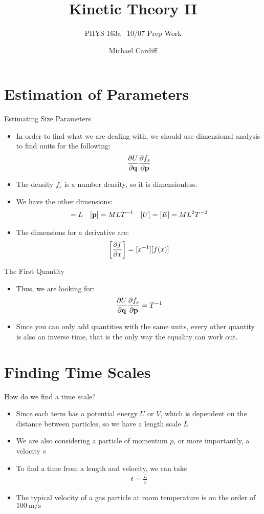 \documentclass{beamer}
\title{Kinetic Theory II}
\author{Michael Cardiff}
\subtitle{PHYS 163a \ 10/07 Prep Work}
\begin{document}
\begin{frame}
  \titlepage
\end{frame}

\section{Estimation of Parameters}
\begin{frame}{Estimating Size Parameters}
  \begin{itemize}
  \item In order to find what we are dealing with, we should use dimensional analysis to find units for the following:
    \begin{align*}
      \pdv{U}{\vb{q}}\pdv{f_s}{\vb{p}}
    \end{align*}
  \item The density $f_s$ is a number density, so it is dimensionless.
  \item We have the other dimensions:
    \begin{align*}
      [\vb{q}]=L\quad[\vb{p}]=MLT^{-1}\quad[U]=[E]=ML^2T^{-2}
    \end{align*}
  \item The dimensions for a derivative are:
    \begin{align*}
      \qty[\pdv{f}{x}]=[x^{-1}][f(x)]
    \end{align*}
  \end{itemize}
\end{frame}
\begin{frame}{The First Quantity}
  \begin{itemize}
  \item Thus, we are looking for:
    \begin{align*}
      \pdv{U}{\vb{q}}\pdv{f_s}{\vb{p}}=T^{-1}
    \end{align*}
  \item Since you can only add quantities with the same units, every other quantity is also an inverse time, that is the only way the equality can work out.
  \end{itemize}
\end{frame}
\section{Finding Time Scales}
\begin{frame}{How do we find a time scale?}
  \begin{itemize}
  \item Since each term has a potential energy $U$ or $V$, which is dependent on the distance between particles, so we have a length scale $L$
  \item We are also considering a particle of momentum $p$, or more importantly, a velocity $v$
  \item To find a time from a length and velocity, we can take
    \begin{align*}
      t=\frac{L}{v}
    \end{align*}
  \item The typical velocity of a gas particle at room temperature is on the order of $\SI{100}{\m\per\s}$
  \end{itemize}
\end{frame}
\end{document}
